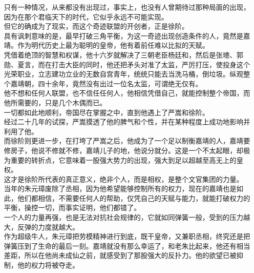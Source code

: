 \begin{multicols}{\theparacolNo}
只有一种情况，从来都没有出现过，事实上，也没有人曾期待过那种局面的出现，因为在那个君临天下的时代，它似乎永远不可能实现。\\

但它的确成为了现实，而这个奇迹联盟的开创者，正是徐阶。\\

具有讽刺意味的是，最早打破三角平衡，为这一奇迹出现创造条件的人，竟然是嘉靖。作为明代历史上最为聪明的皇帝，他有着前任难以比拟的天赋。\\

凭借着绝顶的智慧和权谋，他十六岁就解决了三朝老臣杨廷和，然后是张璁、郭勋、夏言，而在打击大臣的同时，他还把矛头对准了太监，严厉打压，使投身这个光荣职业，立志建功立业的无数自宫青年，统统只能去当洗马桶，倒垃圾。纵观整个嘉靖朝，四十余年，竟然没有出过一位名太监，可谓绝无仅有。\\

他不想和任何人联盟，也不信任任何人，他相信凭借自己，就能控制整个帝国，而他所需要的，只是几个木偶而已。\\

一切都如此地顺利，帝国尽在掌握之中，直到他遇上了严嵩和徐阶。\\

经过二十几年的试探，严嵩摸透了他的脾气和个性，并在某种程度上成功地影响并利用了他。\\

而徐阶则更进一步，在打垮了严嵩之后，他成为了一个足以制衡嘉靖的人，嘉靖要修房子，他说不修就不修，嘉靖儿子的地，他说分就分。这是一个不太起眼，却极为重要的转折点，它意味着一股强大势力的出现，强大到足以超越至高无上的皇权。\\

这才是徐阶所代表的真正意义，绝非个人，而是相权，是整个文官集团的力量。\\

当年的朱元璋废除了丞相，因为他希望能够控制所有的权力，现在的嘉靖也是如此，他们都相信，不需要任何人的帮助，仅凭自己的天赋与能力，就能打破权力的平衡，操控一切，而事实证明，他们都错了。\\

一个人的力量再强，也是无法对抗社会规律的，它就如同弹簧一般，受到的压力越大，反弹的力度就越大。\\

作为超级牛人，朱元璋把劳模精神进行到底，既干皇帝，又兼职丞相，终究还是把弹簧压到了生命的最后一刻。嘉靖就没有那么幸运了，和老朱比起来，他还有相当差距，所以在他尚未成仙之前，就感受到了那股强大的反扑力。他的欲望已被抑制，他的权力将被夺走。\\


\end{multicols}
